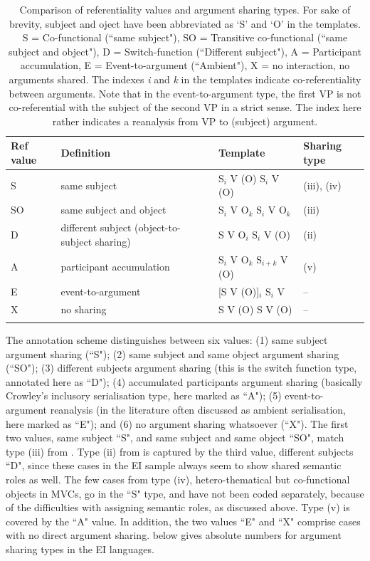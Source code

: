 \begin{table}
\begin{tabular}{l p{4cm} l l}
\lsptoprule
Ref value & Definition & Template & Sharing type \\ 
\midrule 
S & same subject & S$_i$ V (O) S$_i$ V (O) &  (iii), (iv) \\ 
SO & same subject and object & S$_i$ V O$_k$ S$_i$ V O$_k$ & (iii) \\ 
D & different subject (object-to-subject sharing) & S V O$_i$ S$_i$ V (O) & (ii) \\ 
A & participant accumulation & S$_i$ V O$_k$ S$_{i+k}$ V (O) & (v) \\  
E & event-to-argument & [S V (O)]$_i$ S$_i$ V & -- \\ 
X & no sharing & S V (O) S V (O) & -- \\ 
\lspbottomrule 
\end{tabular} 
\caption[Comparison of referentiality and argument sharing types]{Comparison of referentiality values and argument sharing types. For sake of brevity, subject and oject have been abbreviated as `S' and `O' in the templates. S = Co-functional (``same subject"), SO = Transitive co-functional (``same subject and object"), D = Switch-function (``Different subject"), A = Participant accumulation, E = Event-to-argument (``Ambient"), X = no interaction, no arguments shared. The indexes \textit{i} and \textit{k} in the templates indicate co-referentiality between arguments. Note that in the event-to-argument type, the first VP is not co-referential with the subject of the second VP in a strict sense. The index here rather indicates a reanalysis from VP to (subject) argument.}
\label{table:comparison_ref-sharing}
\end{table}

The annotation scheme distinguishes between six values: (1) same subject argument sharing (``S"); (2) same subject and same object argument sharing (``SO"); (3) different subjects argument sharing (this is the switch function type, annotated here as ``D"); (4) accumulated participants argument sharing (basically Crowley's inclusory serialisation type, here marked as ``A"); (5) event-to-argument reanalysis (in the literature often discussed as ambient serialisation, here marked as ``E"); and (6) no argument sharing whatsoever (``X"). The first two values, same subject ``S", and same subject and same object ``SO", match type (iii) from . Type (ii) from  is captured by the third value, different subjects ``D", since these cases in the EI sample always seem to show shared semantic roles as well. The few cases from type (iv), hetero-thematical but co-functional objects in MVCs, go in the ``S" type, and have not been coded separately, because of the difficulties with assigning semantic roles, as discussed above. Type (v) is covered by the ``A" value. In addition, the two values ``E" and ``X" comprise cases with no direct argument sharing.  below gives absolute numbers  for argument sharing types in the EI languages.

